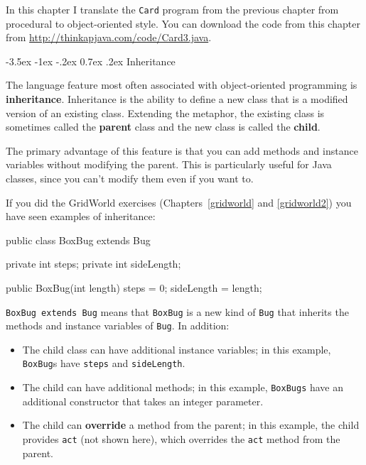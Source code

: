\documentclass[12pt]{book}
\makeatletter
\renewcommand{\section}{\@startsection {section}{1}{\z@}%
    {-3.5ex \@plus -1ex \@minus -.2ex}%
    {0.7ex \@plus.2ex}%
    {\normalfont\Large\bfseries}}
\theoremstyle{exercise}
\newcommand{\java}[1]{\lstinline{#1}} %
\makeatother
\begin{document}
In this chapter I translate the \java{Card} program from the previous chapter from procedural to object-oriented style.
You can download the code from this chapter from \url{http://thinkapjava.com/code/Card3.java}.


\section{Inheritance}

The language feature most often associated with object-oriented programming is {\bf inheritance}.
Inheritance is the ability to define a new class that is a modified version of an existing class.
%
Extending the metaphor, the existing class is sometimes called the {\bf parent} class and the new class is called the {\bf child}.

The primary advantage of this feature is that you can add methods and instance variables without modifying the parent.
This is particularly useful for Java classes, since you can't modify them even if you want to.

If you did the GridWorld exercises (Chapters~\ref{gridworld} and \ref{gridworld2}) you have seen examples of inheritance:

\begin{code}
public class BoxBug extends Bug {
    private int steps;
    private int sideLength;

    public BoxBug(int length) {
        steps = 0;
        sideLength = length;
    }
}
\end{code}

\java{BoxBug extends Bug} means that \java{BoxBug} is a new kind of \java{Bug} that inherits the methods and instance variables of \java{Bug}.
In addition:

\begin{itemize}

\item The child class can have additional instance variables; in this example, \java{BoxBug}s have \java{steps} and \java{sideLength}.

\item The child can have additional methods; in this example, \java{BoxBugs} have an additional constructor that takes an integer parameter.

\item The child can {\bf override} a method from the parent; in this example, the child provides \java{act} (not shown here), which overrides the \java{act} method from the parent.

\end{itemize}
\end{document}
